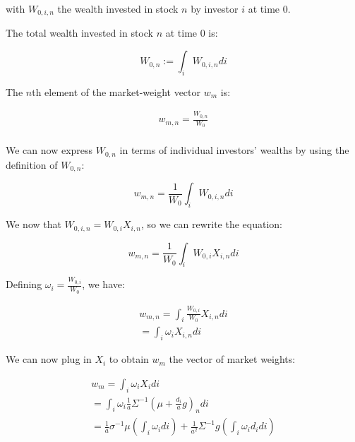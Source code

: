 with $W_{0,i,n}$ the wealth invested in stock $n$ by investor $i$ at time 0.

The total wealth invested in stock $n$ at time 0 is:

\begin{equation}
    W_{0,n} := \int_i W_{0,i,n} di
\end{equation}

The $n$th element of the market-weight vector $w_m$ is:

\begin{equation}
    \begin{aligned}
    w_{m,n} = \frac{W_{0,n}}{W_{0}} \\
    \end{aligned}
\end{equation}

We can now express $W_{0,n}$ in terms of individual investors' wealths
by using the definition of $W_{0,n}$:

\begin{equation}
    w_{m,n} = \frac{1}{W_0} \int_i W_{0,i,n} di
\end{equation}

We now that $W_{0,i,n} = W_{0,i} X_{i,n}$, so we can rewrite the equation:

\begin{equation}
    w_{m,n} = \frac{1}{W_0} \int_i W_{0,i} X_{i,n} di
\end{equation}

Defining $\omega_i = \frac{W_{0,i}}{W_0}$, we have:

\begin{equation}
    \begin{aligned}
    w_{m,n} = \int_i \frac{W_{0,i}}{W_0} X_{i,n} di\\
    = \int_i \omega_i X_{i,n} di
    \end{aligned}
\end{equation}

We can now plug in $X_i$ to obtain $w_m$ the vector 
of market weights: 

\begin{equation}
    \begin{aligned}
    w_{m} = \int_i \omega_i X_i di \\ 
     = \int_i \omega_i \frac{1}{a} \Sigma^{-1}(\mu + \frac{d_i}{a}g)_n di \\
     = \frac{1}{a} \sigma^{-1} \mu (\int_i \omega_i di) + \frac{1}{a^2} \Sigma^{-1} g (\int_i \omega_i d_i di)
    \end{aligned}
\end{equation}


